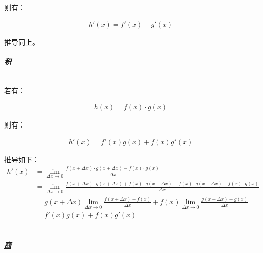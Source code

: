 \documentclass[12pt]{article}
\begin{document}
则有：

\begin{equation*}
\begin{aligned}
h'(x) = f'(x) - g'(x)
\end{aligned}
\end{equation*}

推导同上。

\paragraph{\textbf{\emph{\underline{积}}}}

\quad \\

若有：

\begin{equation*}
\begin{aligned}
h(x) = f(x) \cdot g(x)
\end{aligned}
\end{equation*}

则有：

\begin{equation*}
\begin{aligned}
h'(x) = f'(x)g(x) + f(x)g'(x)
\end{aligned}
\end{equation*}

推导如下：\\

\begin{equation*}
\begin{aligned}
h'(x) & = \lim_{\Delta x \to 0}\frac{f(x + \Delta x) \cdot g(x + \Delta x) - f(x) \cdot g(x)}{\Delta x}\\
& = \lim_{\Delta x \to 0}\frac{f(x + \Delta x) \cdot g(x + \Delta x) + f(x) \cdot g(x + \Delta x) - f(x) \cdot g(x + \Delta x) - f(x) \cdot g(x)}{\Delta x}\\
& = g(x + \Delta x)\lim_{\Delta x \to 0}\frac{f(x + \Delta x) - f(x)}{\Delta x} + f(x)\lim_{\Delta x \to 0}\frac{g(x + \Delta x) - g(x)}{\Delta x}\\
& = f'(x)g(x) + f(x)g'(x)
\end{aligned}
\end{equation*}
\\
\paragraph{\textbf{\emph{\underline{商}}}}

\quad \\
\end{document}
